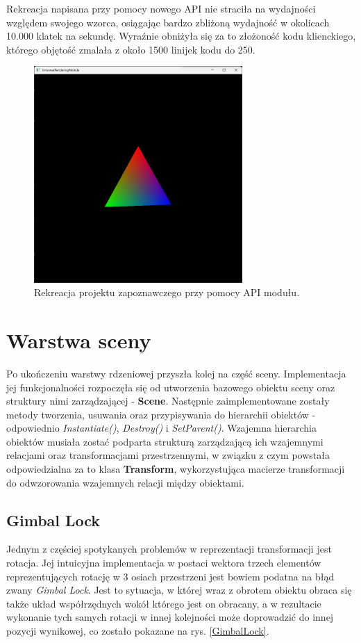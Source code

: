 Rekreacja napisana przy pomocy nowego API nie straciła na wydajności względem swojego wzorca, osiągając bardzo zbliżoną wydajność w okolicach 10.000 klatek na sekundę. Wyraźnie obniżyła się za to złożoność kodu klienckiego, którego objętość zmalała z około 1500 linijek kodu do 250. 

\begin{figure}[h!]
	\centering
	\includegraphics[width=300px]{images/impl/2_rotating_triangle.png}
	\caption{Rekreacja projektu zapoznawczego przy pomocy API modułu.}
	\label{Impl_RotatingTriangle}
\end{figure}

\section{Warstwa sceny}
Po ukończeniu warstwy rdzeniowej przyszła kolej na część sceny. Implementacja jej funkcjonalności rozpoczęła się od utworzenia bazowego obiektu sceny oraz struktury nimi zarządzającej - \textbf{Scene}. Następnie zaimplementowane zostały metody tworzenia, usuwania oraz przypisywania do hierarchii obiektów - odpowiednio \textit{Instantiate()}, \textit{Destroy()} i \textit{SetParent()}. Wzajemna hierarchia obiektów musiała zostać podparta strukturą zarządzającą ich wzajemnymi relacjami oraz transformacjami przestrzennymi, w związku z czym powstała odpowiedzialna za to klasa \textbf{Transform}, wykorzystująca macierze transformacji do odwzorowania wzajemnych relacji między obiektami.

\subsection{Gimbal Lock}
Jednym z częściej spotykanych problemów w reprezentacji transformacji jest rotacja. Jej intuicyjna implementacja w postaci wektora trzech elementów reprezentujących rotację w 3 osiach przestrzeni jest bowiem podatna na błąd zwany \textit{Gimbal Lock}. Jest to sytuacja, w której wraz z obrotem obiektu obraca się także układ współrzędnych wokół którego jest on obracany, a w rezultacie wykonanie tych samych rotacji w innej kolejności może doprowadzić do innej pozycji wynikowej, co zostało pokazane na rys. \ref{GimbalLock}.

